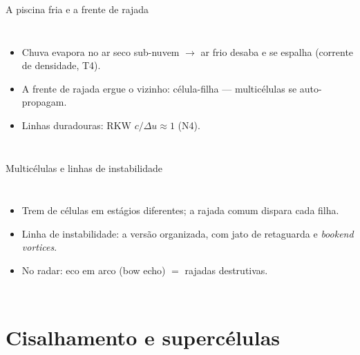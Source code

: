 \documentclass[aspectratio=169,11pt]{beamer}
\begin{document}
\begin{frame}{A piscina fria e a frente de rajada}
  \begin{columns}
    \vspace{0.4em}
    \begin{itemize}
      \item Chuva evapora no ar seco sub-nuvem $\to$ ar frio desaba e
            se espalha (corrente de densidade, T4).
      \item A frente de rajada ergue o vizinho: célula-filha —
            multicélulas se auto-propagam.
      \item Linhas duradouras: RKW $c/\Delta u \approx 1$ (N4).
    \end{itemize}
  \end{columns}
\end{frame}

\begin{frame}{Multicélulas e linhas de instabilidade}
  \begin{columns}
    \begin{itemize}
      \item Trem de células em estágios diferentes; a rajada comum
            dispara cada filha.
      \item Linha de instabilidade: a versão organizada, com jato de
            retaguarda e \emph{bookend vortices}.
      \item No radar: eco em arco (bow echo) $=$ rajadas destrutivas.
    \end{itemize}
  \end{columns}
\end{frame}

\section{Cisalhamento e supercélulas}
\end{document}
